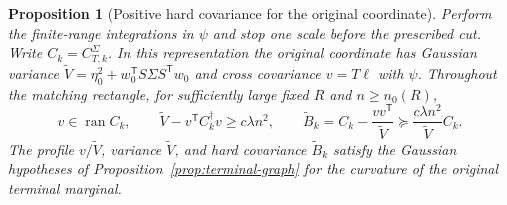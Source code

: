 \documentclass[11pt]{article}
\newtheorem{proposition}[theorem]{Proposition}
\theoremstyle{definition}
\begin{document}
\begin{proposition}[Positive hard covariance for the original coordinate]
\label{prop:prescribed-positive}
Perform the finite-range integrations in \(\psi\) and stop one scale
before the prescribed cut. Write \(C_k=C^\Sigma_{T,k}\). In this
representation the original coordinate has Gaussian variance
\(\widetilde V=\eta_0^2+w_0^{\mathsf T}S\Sigma S^{\mathsf T}w_0\)
and cross covariance \(v=T\ell\) with \(\psi\). Throughout the
matching rectangle, for sufficiently large fixed \(R\) and
\(n\ge n_0(R)\),
\begin{equation}
 v\in\operatorname{ran} C_k,\qquad
 \widetilde V-v^{\mathsf T}C_k^\dagger v\ge c\lambda n^2,\qquad
 \widetilde B_k=C_k-\frac{vv^{\mathsf T}}{\widetilde V}
       \succeq \frac{c\lambda n^2}{\widetilde V}C_k .
 \label{eq:prescribed-positive}
\end{equation}
The profile \(v/\widetilde V\), variance \(\widetilde V\), and
hard covariance \(\widetilde B_k\) satisfy the Gaussian
hypotheses of Proposition~\ref{prop:terminal-graph} for the
curvature of the original terminal marginal.
\end{proposition}
\end{document}
